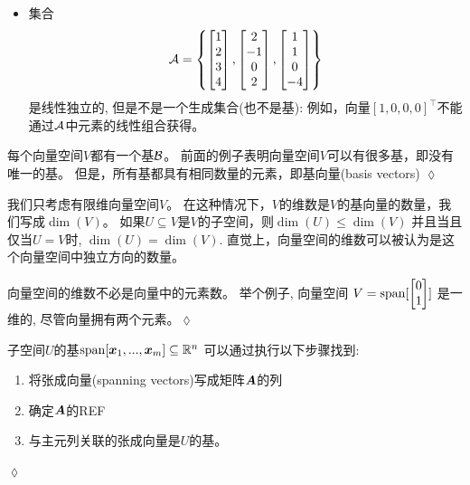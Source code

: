 \begin{example}
\begin{itemize}
\begin{equation}
        \end{equation}
        \item 集合
        \begin{equation}
           \mathcal{A} = \left\{
               \begin{bmatrix}
                   1 \\ 2 \\ 3 \\ 4
               \end{bmatrix},
               \begin{bmatrix}
                   2 \\ -1 \\ 0 \\ 2
               \end{bmatrix},
               \begin{bmatrix}
                   1 \\ 1 \\ 0 \\ -4
               \end{bmatrix}
           \right\}
        \end{equation}
        是线性独立的, 但是不是一个生成集合(也不是基):
        例如，向量$[1, 0, 0, 0]^\top$不能通过$\mathcal{A}$中元素的线性组合获得。
    \end{itemize}
\end{example}

\begin{remark}
    每个向量空间$V$都有一个基$\mathcal{B}$。
    前面的例子表明向量空间$V$可以有很多基，即没有唯一的基。
    但是，所有基都具有相同数量的元素，即基向量(basis vectors)
    \hfill $\lozenge$
\end{remark}

我们只考虑有限维向量空间$V$。
在这种情况下，$V$的维数是$V$的基向量的数量，我们写成$\dim(V)$。
如果$U \subseteq V$是$V$的子空间，则$\dim(U) \leqslant \dim(V)$
并且当且仅当$U=V$时, $\dim(U) = \dim(V)$.
直觉上，向量空间的维数可以被认为是这个向量空间中独立方向的数量。

\begin{remark}
    向量空间的维数不必是向量中的元素数。
    举个例子, 向量空间
    $V = \mathrm{span} [\begin{bmatrix} 0 \\ 1 \end{bmatrix}]$
    是一维的, 尽管向量拥有两个元素。\hfill $\lozenge$
\end{remark}

\begin{remark}
   子空间$U$的基$\mathrm{span}[\boldsymbol{x}_1,...,\boldsymbol{x}_m] \subseteq \mathbb{R}^n$
   可以通过执行以下步骤找到:
   \begin{enumerate}
       \item 将张成向量(spanning vectors)写成矩阵$\boldsymbol{A}$的列
       \item 确定$\boldsymbol{A}$的REF
       \item 与主元列关联的张成向量是$U$的基。
   \end{enumerate}
   \hfill $\lozenge$
\end{remark}

